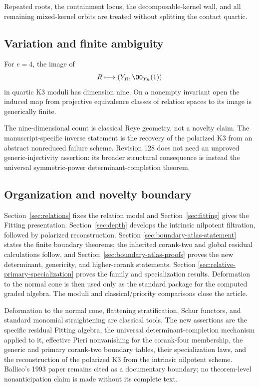 Repeated roots, the containment locus, the decomposable-kernel wall,
and all remaining mixed-kernel orbits are treated without splitting
the contact quartic.

\subsection{Variation and finite ambiguity}

\begin{theorem}
\label{thm:main-moduli}
For \(e=4\), the image of
\[
 R\longmapsto(Y_R,\OO_{Y_R}(1))
\]
in quartic K3 moduli has dimension nine.  On a nonempty invariant
open the induced map from projective equivalence classes of relation
spaces to its image is generically finite.
\end{theorem}

The nine-dimensional count is classical Reye geometry, not a novelty
claim.  The manuscript-specific inverse statement is the recovery of
the polarized K3 from an abstract nonreduced failure scheme.  Revision
128 does not need an unproved generic-injectivity assertion: its
broader structural consequence is instead the universal symmetric-power
determinant-completion theorem.

\subsection{Organization and novelty boundary}

Section~\ref{sec:relations} fixes the relation model and
Section~\ref{sec:fitting} gives the Fitting presentation.
Section~\ref{sec:depth} develops the intrinsic nilpotent filtration,
followed by polarized reconstruction.  Section
\ref{sec:boundary-atlas-statement} states the finite boundary theorems;
the inherited corank-two and global residual calculations follow, and
Section~\ref{sec:boundary-atlas-proofs} proves the new determinant,
genericity, and higher-corank statements.  Section
\ref{sec:relative-primary-specialization} proves the family and
specialization results.  Deformation to the normal cone is then used
only as the standard package for the computed graded algebra.  The
moduli and classical/priority comparisons close the article.

Deformation to the normal cone, flattening stratification, Schur
functors, and standard monomial straightening are classical tools.
The new assertions are the specific residual Fitting algebra, the
universal determinant-completion mechanism applied to it, effective
Pieri nonvanishing for the corank-four membership, the generic and
primary corank-two boundary tables, their specialization laws, and
the reconstruction of the polarized K3 from the intrinsic nilpotent
scheme.  Ballico's 1993 paper remains cited as a documentary boundary;
no theorem-level nonanticipation claim is made without its complete
text.
